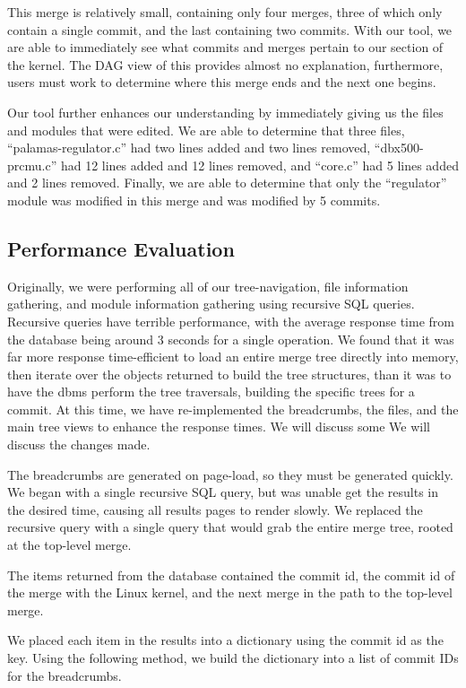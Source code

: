 \documentclass[conference, draftclsnofoot]{IEEEtran}
\begin{document}
This merge is relatively small, containing only four merges, three of which
only contain a single commit, and the last containing two commits. With our
tool, we are able to immediately see what commits and merges pertain to our
section of the kernel. The DAG view of this provides almost no explanation,
furthermore, users must work to determine where this merge ends and the next one
begins.

Our tool further enhances our understanding by immediately giving us the files
and modules that were edited. We are able to determine that three files,
``palamas-regulator.c'' had two lines added and two lines removed,
``dbx500-prcmu.c'' had 12 lines added and 12 lines removed, and ``core.c'' had
5 lines added and 2 lines removed. Finally, we are able to determine that only
the ``regulator'' module was modified in this merge and was modified by 5
commits.

\subsection{Performance Evaluation}
Originally, we were performing all of our tree-navigation, file information
gathering, and module information gathering using recursive SQL queries.
Recursive queries have terrible performance, with the average response time
from the database being around 3 seconds for a single operation. We found that
it was far more response time-efficient to load an entire merge tree directly
into memory, then iterate over the objects returned to build the tree
structures, than it was to have the dbms perform the tree traversals, building
the specific trees for a commit. At this time, we have re-implemented the
breadcrumbs, the files, and the main tree views to enhance the response times.
We will discuss some We will discuss the changes made.

The breadcrumbs are generated on page-load, so they must be generated quickly.
We began with a single recursive SQL query, but was unable get the results in
the desired time, causing all results pages to render slowly. We replaced the
recursive query with a single query that would grab the entire merge tree,
rooted at the top-level merge.

The items returned from the database contained the commit id, the commit id of
the merge with the Linux kernel, and the next merge in the path to the
top-level merge.

We placed each item in the results into a dictionary using the commit id as the
key. Using the following method, we build the dictionary into a list of commit
IDs for the breadcrumbs.
\end{document}
